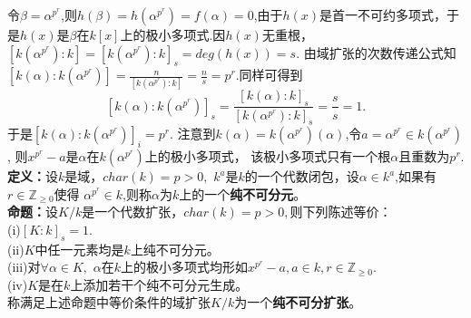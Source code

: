 \documentclass[UTF8]{article}
\begin{document}
令$\beta=\alpha^{p^{r}}$,则$h(\beta)=h(\alpha^{p^{r}})=f(\alpha)=0$,由于$h(x)$是首一不可约多项式，于是$h(x)$是$\beta$在$k[x]$上的极小多项式.因$h(x)$无重根，
$[k(\alpha^{p^{r}}):k]=[k(\alpha^{p^{r}}):k]_{s}=deg(h(x))=s.$
由域扩张的次数传递公式知$[k(\alpha):k(\alpha^{p^{r}})]=\frac{n}{[k(\alpha^{p^{r}}):k]}=\frac{n}{s}=p^{r}.$同样可得到
$$  
[k(\alpha):k(\alpha^{p^{r}})]_{s}=\frac{[k(\alpha):k]_{s}}{[k(\alpha^{p^{r}}):k]_{s}}=\frac{s}{s}=1.	
$$
于是$[k(\alpha):k(\alpha^{p^{r}})]_{i}=p^{r}.$
注意到$k(\alpha)=k(\alpha^{p^{r}})(\alpha)$,令$a=\alpha^{p^{r}}\in k(\alpha^{p^{r}})$,
则$x^{p^{r}}-a$是$\alpha$在$k(\alpha^{p^{r}})$上的极小多项式，
该极小多项式只有一个根$\alpha$且重数为$p^{r}.$\\
\textbf{定义：}设$k$是域，$char(k)=p>0,$ $k^{a}$是$k$的一个代数闭包，设$\alpha\in k^{a}$,如果有$r\in \mathbb{Z}_{\geq 0}$使得
$\alpha^{p^{r}}\in k$,则称$\alpha$为$k$上的一个\textbf{纯不可分元}。\\
\textbf{命题：}设$K/k$是一个代数扩张，$char(k)=p>0,$则下列陈述等价：\\
(i)$[K:k]_{s}=1.$\\
(ii)$K$中任一元素均是$k$上纯不可分元。\\
(iii)对$\forall \alpha \in K,$  $\alpha$在$k$上的极小多项式均形如$x^{p^{r}}-a,a\in k,r\in \mathbb{Z}_{\geq 0}.$\\
(iv)$K$是在$k$上添加若干个纯不可分元生成。\\
称满足上述命题中等价条件的域扩张$K/k$为一个\textbf{纯不可分扩张}。\\
\end{document}
